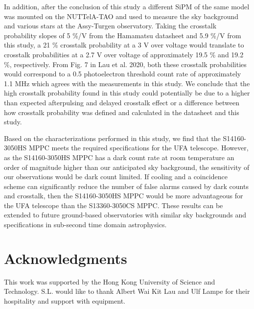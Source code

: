 \documentclass{article}
\begin{document}
In addition, after the conclusion of this study a different SiPM of the same model was mounted on the NUTTelA-TAO and used to measure the sky background and various stars at the Assy-Turgen observatory.\cite{lau2020sky} Taking the crosstalk probability slopes of 5 \%/V from the Hamamatsu datasheet\cite{hamamtsu2016s13360} and 5.9 \%/V from this study, a 21 \% crosstalk probability at a 3 V over voltage would translate to crosstalk probabilities at a 2.7 V over voltage of approximately 19.5 \% and 19.2 \%, respectively. From Fig. 7 in Lau et al. 2020,\cite{lau2020sky} both these crosstalk probabilities would correspond to a 0.5 photoelectron threshold count rate of approximately 1.1 MHz which agrees with the measurements in this study. We conclude that the high crosstalk probability found in this study could potentially be due to a higher than expected afterpulsing and delayed crosstalk effect or a difference between how crosstalk probability was defined and calculated in the datasheet and this study.

Based on the characterizations performed in this study, we find that the S14160-3050HS MPPC meets the required specifications for the UFA telescope. However, as the S14160-3050HS MPPC has a dark count rate at room temperature an order of magnitude higher than our anticipated sky background, the sensitivity of our observations would be dark count limited. If cooling and a coincidence scheme can significantly reduce the number of false alarms caused by dark counts and crosstalk, then the S14160-3050HS MPPC would be more advantageous for the UFA telescope than the S13360-3050CS MPPC. These results can be extended to future ground-based
observatories with similar sky backgrounds and specifications in sub-second time domain astrophysics.

\section*{Acknowledgments}
This work was supported by the Hong Kong University of Science and Technology. S.L. would like to thank Albert Wai Kit Lau and Ulf Lampe for their hospitality and support with equipment.



\end{document}
